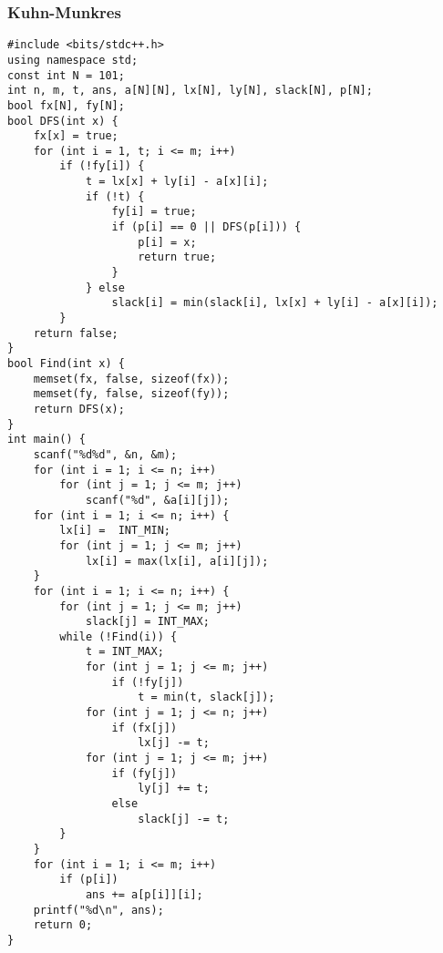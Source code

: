 \documentclass[a4paper]{article}
\begin{document}
\subsubsection{Kuhn-Munkres}
\begin{lstlisting}
#include <bits/stdc++.h>
using namespace std;
const int N = 101;
int n, m, t, ans, a[N][N], lx[N], ly[N], slack[N], p[N];
bool fx[N], fy[N];
bool DFS(int x) {
    fx[x] = true;
    for (int i = 1, t; i <= m; i++)
        if (!fy[i]) {
            t = lx[x] + ly[i] - a[x][i];
            if (!t) {
                fy[i] = true;
                if (p[i] == 0 || DFS(p[i])) {
                    p[i] = x;
                    return true;
                }
            } else
                slack[i] = min(slack[i], lx[x] + ly[i] - a[x][i]);
        }
    return false;
}
bool Find(int x) {
    memset(fx, false, sizeof(fx));
    memset(fy, false, sizeof(fy));
    return DFS(x);
}
int main() {
    scanf("%d%d", &n, &m);
    for (int i = 1; i <= n; i++)
        for (int j = 1; j <= m; j++)
            scanf("%d", &a[i][j]);
    for (int i = 1; i <= n; i++) {
        lx[i] =  INT_MIN;
        for (int j = 1; j <= m; j++)
            lx[i] = max(lx[i], a[i][j]);
    }
    for (int i = 1; i <= n; i++) {
        for (int j = 1; j <= m; j++)
            slack[j] = INT_MAX;
        while (!Find(i)) {
            t = INT_MAX;
            for (int j = 1; j <= m; j++)
                if (!fy[j])
                    t = min(t, slack[j]);
            for (int j = 1; j <= n; j++)
                if (fx[j])
                    lx[j] -= t;
            for (int j = 1; j <= m; j++)
                if (fy[j])
                    ly[j] += t;
                else
                    slack[j] -= t;
        }
    }
    for (int i = 1; i <= m; i++)
        if (p[i])
            ans += a[p[i]][i];
    printf("%d\n", ans);
    return 0;
}
\end{lstlisting}
\end{document}
